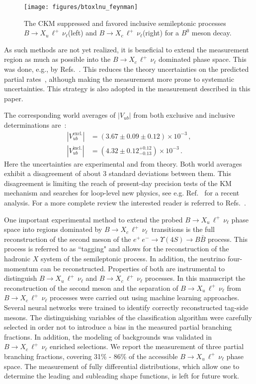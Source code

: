 \documentclass[twocolumn,aps,prd,superscriptaddress,nofootinbib,floatfix,preprintnumbers,a4]{revtex4-1}
\newcommand{\bulnu}{\ensuremath{B \to X_u \, \ell^+\, \nu_{\ell}}\xspace}
\newcommand{\bclnu}{\ensuremath{B \to X_c \, \ell^+\, \nu_{\ell}}\xspace}
\begin{document}
\begin{figure}[t!]
  \texttt{[image: figures/btoxlnu\_feynman]} 
\caption{
The CKM suppressed and favored inclusive semileptonic processes \bulnu (left) and \bclnu (right) for a $B^0$ meson decay.
 }
\label{fig:bulnu_bclnu}
\end{figure}


As such methods are not yet realized, it is  beneficial to extend the measurement region as much as possible into the \bclnu dominated phase space. This was done, e.g., by Refs.~\cite{Lees:2011fv,Urquijo:2009tp}. This reduces the theory uncertainties on the predicted partial rates~\cite{BLNP, GGOU, DGE1,DGE2,ADFR1,ADFR2}, although making the measurement more prone to systematic uncertainties. This strategy is also adopted in the measurement described in this paper. 

The corresponding world averages of $|V_{ub}|$ from both exclusive and inclusive determinations are~\cite{Amhis:2019ckw}:
\begin{align}
 |V_{ub}^{\mathrm{excl.}}| & =  \left(3.67 \pm 0.09 \pm 0.12 \right) \times 10^{-3} \, , \\
 |V_{ub}^{\mathrm{incl.}}| & = \left( 4.32 \pm 0.12 {}^{+0.12}_{-0.13} \right) \times 10^{-3} \, .
\end{align}
Here the uncertainties are experimental and from theory. Both world averages exhibit a disagreement of about 3 standard deviations between them. This disagreement is limiting the reach of present-day precision tests of the KM mechanism and searches for loop-level new physics, see e.g. Ref.~\cite{Bona:ICHEP2020} for a recent analysis. For a more complete review the interested reader is referred to Refs.~\cite{RevModPhys.88.035008,pdg_Vxb:2020}.

One important experimental method to extend the probed \bulnu phase space into regions dominated by \bclnu\ transitions is the full reconstruction of the second \PB meson of the $e^+ \, e^- \to \Upsilon(4S) \to B \bar B$ process. This process is referred to as ``tagging" and allows for the reconstruction of the hadronic $X$ system of the semileptonic process. In addition, the neutrino four-momentum can be reconstructed. Properties of both are instrumental to distinguish \bulnu and \bclnu processes. In this manuscript the reconstruction of the second \PB meson  and the separation of \bulnu from \bclnu processes were carried out using machine learning approaches. Several neural networks were trained to identify correctly reconstructed tag-side \PB mesons. The distinguishing variables of the classification algorithm were carefully selected in order not to introduce a bias in the measured partial branching fractions. In addition, the modeling of backgrounds was validated in \bclnu enriched selections. We report the measurement of three partial branching fractions, covering 31\% - 86\% of the accessible \bulnu phase space. The measurement of fully differential distributions, which allow one to determine the leading and subleading shape functions, is left for future work. 
\end{document}
